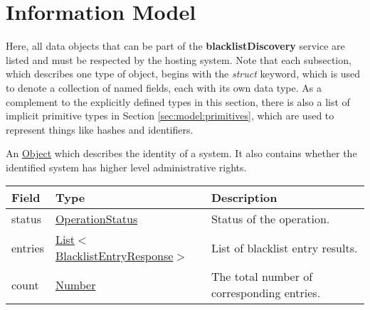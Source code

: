 \documentclass[a4paper]{arrowhead}
\newcommand{\pref}[1]{{\textcolor{ArrowheadGrey}{\hyperref[sec:model:primitives:#1]{#1}}}}
\begin{document}
\section{Information Model}
\label{sec:model}

Here, all data objects that can be part of the \textbf{blacklistDiscovery} service are listed and must be respected by the hosting system.
Note that each subsection, which describes one type of object, begins with the \textit{struct} keyword, which is used to denote a collection of named fields, each with its own data type.
As a complement to the explicitly defined types in this section, there is also a list of implicit primitive types in Section \ref{sec:model:primitives}, which are used to represent things like hashes and identifiers.



An \pref{Object} which describes the identity of a system. It also contains whether the identified system has higher level administrative rights.

 
\begin{table}[ht!]
\begin{tabularx}{\textwidth}{| p{4.25cm} | p{5cm} | X |} \hline
\rowcolor{gray!33} Field & Type      & Description \\ \hline
status & \pref{OperationStatus} & Status of the operation. \\ \hline
entries & \pref{List}$<$\hyperref[sec:model:BlacklistEntryResponse]{BlacklistEntryResponse}$>$ & List of blacklist entry results. \\ \hline
count & \pref{Number} & The total number of corresponding entries. \\ \hline
\end{tabularx}
\end{table}

\clearpage

\end{document}
